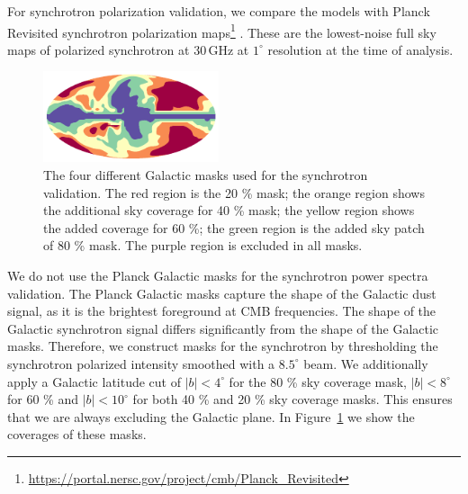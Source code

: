 \documentclass[twocolumn]{aastex631}
\begin{document}
For synchrotron polarization validation, we compare the models with Planck Revisited synchrotron polarization maps\footnote{\url{https://portal.nersc.gov/project/cmb/Planck\_Revisited}} \citep{Delabrouille:2024}. These are the lowest-noise full sky maps of polarized synchrotron at 30\,GHz at $1^\circ$ resolution at the time of analysis. 

\begin{figure}
    \centering
    \includegraphics[width=0.46\textwidth]{figures/SYNC_mask_stack.png}
    \caption{The four different Galactic masks used for the synchrotron validation. The red region is the 20 \% mask; the orange region shows the additional sky coverage for 40 \% mask; the yellow region shows the added coverage for 60 \%; the green region is the added sky patch of 80 \% mask. The purple region is excluded in all masks.}
    \label{fig:sync_masks}
\end{figure}

We do not use the Planck Galactic masks for the synchrotron power spectra validation. The Planck Galactic masks capture the shape of the Galactic dust signal, as it is the brightest foreground at CMB frequencies. The shape of the Galactic synchrotron signal differs significantly from the shape of the Galactic masks. Therefore, we construct masks for the synchrotron by thresholding the synchrotron polarized intensity smoothed with a $8.5^\circ$ beam. We additionally apply a Galactic latitude cut of $|b| < 4^\circ$ for the 80 \% sky coverage mask, $|b| < 8^\circ$ for 60 \% and $|b| < 10^\circ$ for both 40 \% and 20 \% sky coverage masks. This ensures that we are always excluding the Galactic plane. In Figure~\ref{fig:sync_masks} we show the coverages of these masks. 
\end{document}
